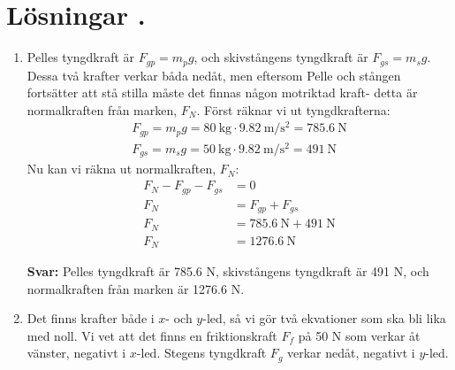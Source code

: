 \documentclass[11pt]{article}
\begin{document}
\section*{Lösningar \thesection.}
\begin{enumerate}[itemsep=2em]
        \item
              \begin{minipage}[t]{0.5\textwidth}
                      Pelles tyngdkraft är $F_{gp} = m_pg$, och skivstångens tyngdkraft är $F_{gs} = m_sg$. Dessa två krafter verkar båda nedåt, men eftersom Pelle och stången fortsätter att stå stilla måste det finnas någon motriktad kraft- detta är normalkraften från marken, $F_{N}$. Först räknar vi ut tyngdkrafterna:
                      \begin{gather*}
                              F_{gp} = m_pg = \SI{80}{\kilogram} \cdot \SI{9.82}{\meter/\second\squared} = \SI{785.6}{\newton} \\
                              F_{gs} = m_sg = \SI{50}{\kilogram} \cdot \SI{9.82}{\meter/\second\squared} = \SI{491}{\newton}
                      \end{gather*}
                      Nu kan vi räkna ut normalkraften, $F_{N}$:
                      \begin{align*}
                              F_{N} - F_{gp} - F_{gs} & = 0                                       \\
                              F_{N}                   & = F_{gp} + F_{gs}                         \\
                              F_{N}                   & = \SI{785.6}{\newton} + \SI{491}{\newton} \\
                              F_{N}                   & = \SI{1276.6}{\newton}
                      \end{align*}
              \end{minipage}
              \hspace{2em}
              \begin{adjustbox}{valign=t}
                      
              \end{adjustbox}

              \textbf{Svar:} Pelles tyngdkraft är 785.6 N, skivstångens tyngdkraft är 491 N, och normalkraften från marken är 1276.6 N.

              \newpage
        \item
              \begin{minipage}[t]{0.5\textwidth}
                      \raggedright
                      Det finns krafter både i $x$- och $y$-led, så vi gör två ekvationer som ska bli lika med noll. Vi vet att det finns en friktionskraft $F_f$ på 50 N som verkar åt vänster, negativt i $x$-led. Stegens tyngdkraft $F_{g}$ verkar nedåt, negativt i $y$-led.


\end{minipage}
\end{enumerate}
\end{document}
